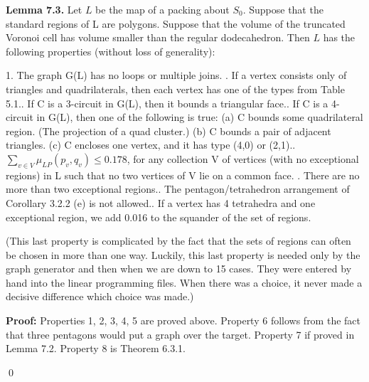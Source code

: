 {\bf Lemma 7.3.} Let $L$ be the map of a packing about $S_0$.
Suppose that the standard regions of L are polygons.  
Suppose that the volume of the truncated Voronoi cell has volume smaller than 
the regular dodecahedron.
Then $L$ has the following properties (without loss of generality): 

1. The graph G(L) has no loops or multiple joins. . If a vertex consists only of triangles and quadrilaterals, then each vertex has one of the types from Table 5.1.. If C is a 3-circuit in G(L), then it bounds a triangular face.. If C is a 4-circuit in G(L), then one of the following is true:\newline
(a) C bounds some quadrilateral region. (The projection of a quad cluster.)\newline
(b) C bounds a pair of adjacent triangles.\newline
(c) C encloses one vertex, and it has type (4,0) or (2,1).. $\sum_{v\in V} \mu_{LP}(p_v,q_v) \leq 0.178$, for any collection V of vertices (with no exceptional regions) in L such that no two vertices of V lie on a common face. . There are no more than two exceptional regions.. The pentagon/tetrahedron arrangement of Corollary 3.2.2 (e) is not allowed.. If a vertex has 4 tetrahedra and one exceptional region, we add 0.016 to the squander of the set of regions.

\smallskip
(This last property is complicated by the fact that the sets of regions can often be chosen in more than one way.  
Luckily, this last property is needed only by the graph generator and then
when we are down to 15 cases.  They were entered by hand into the linear programming files.  When there was a choice, it never made a decisive difference which choice was made.) \newline

\bigskip

{\bf Proof:} Properties 1, 2, 3, 4, 5 are proved above.
Property 6 follows from the fact that three pentagons would put 
a graph over the target.
Property 7 if proved in Lemma 7.2.
Property 8 is Theorem 6.3.1.

\qed




